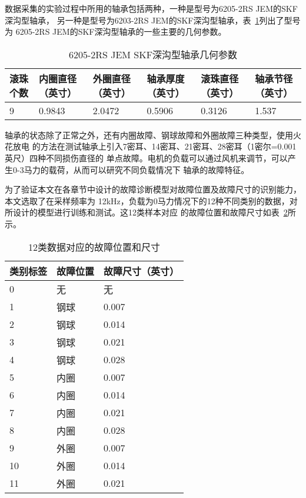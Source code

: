 数据采集的实验过程中所用的轴承包括两种，一种是型号为6205-2RS JEM的SKF深沟型轴承，
另一种是型号为6203-2RS JEM的SKF深沟型轴承，表~\ref{tab:bearing_params}列出了型号为
6205-2RS JEM的SKF深沟型轴承的一些主要的几何参数。
\begin{table}[htb]
  \centering
  \begin{minipage}[t]{0.8\linewidth} %
  \caption{6205-2RS JEM SKF深沟型轴承几何参数}
  \label{tab:bearing_params}
    \begin{tabularx}{\linewidth}{lXXXXX}
      \toprule[1.5pt]
      滚珠个数 & 内圈直径（英寸）& 外圈直径（英寸）& 轴承厚度（英寸）& 滚珠直径（英寸）& 轴承节径（英寸） \\\midrule[1pt]
      9 & 0.9843 & 2.0472 & 0.5906 & 0.3126 & 1.537 \\\bottomrule[1.5pt]
    \end{tabularx}
  \end{minipage}
\end{table}

轴承的状态除了正常之外，还有内圈故障、钢球故障和外圈故障三种类型，使用火花放电
的方法在测试轴承上引入7密耳、14密耳、21密耳、28密耳（1密尔=0.001英尺）四种不同损伤直径的
单点故障。电机的负载可以通过风机来调节，可以产生0-3马力的载荷，从而可以研究不同负载情况下
轴承的故障特征。

为了验证本文在各章节中设计的故障诊断模型对故障位置及故障尺寸的识别能力，本文选取了在采样频率为
12kHz，负载为0马力情况下的12种不同类别的数据，对所设计的模型进行训练和测试。这12类样本对应
的故障位置和故障尺寸如表~\ref{tab:class_desc}所示。
\begin{table}[htb]
  \centering
  \begin{minipage}[t]{0.8\linewidth} %
  \caption{12类数据对应的故障位置和尺寸}
  \label{tab:class_desc}
    \begin{tabularx}{\linewidth}{lXX}
      \toprule[1.5pt]
      类别标签 & 故障位置 & 故障尺寸（英寸） \\\midrule[1pt]
      0 & 无 & 无 \\
      1 & 钢球 & 0.007 \\
      2 & 钢球 & 0.014 \\
      3 & 钢球 & 0.021 \\
      4 & 钢球 & 0.028 \\
      5 & 内圈 & 0.007 \\
      6 & 内圈 & 0.014 \\
      7 & 内圈 & 0.021 \\
      8 & 内圈 & 0.028 \\
      9 & 外圈 & 0.007 \\
      10 & 外圈 & 0.014 \\
      11 & 外圈 & 0.021 \\
      \bottomrule[1.5pt]
    \end{tabularx}
  \end{minipage}
\end{table}

